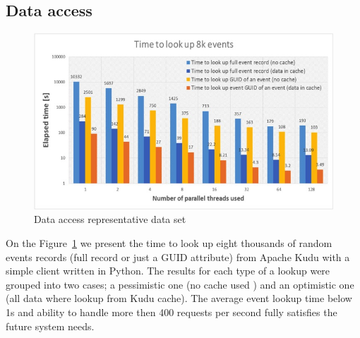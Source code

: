 \documentclass{webofc}
\begin{document}
\begin{linenumbers}
\subsection{Data access}
\label{sec-6-da}
\begin{figure}
\centering
\includegraphics[width=\linewidth,clip]{data_access.jpg}
\caption{Data access representative data set}
\label{fig:access}
\end{figure}
On the Figure~\ref{fig:access} we present the time to look up eight thousands of random events records (full record or just a GUID attribute) from Apache Kudu with a simple client written in Python.
The results for each type of a lookup were grouped into two cases; a pessimistic one (no cache used ) and an optimistic one (all data where lookup from Kudu cache).
The average event lookup time below 1s and ability to handle more then 400 requests per second fully satisfies the future system needs. 


\end{linenumbers}
\end{document}
